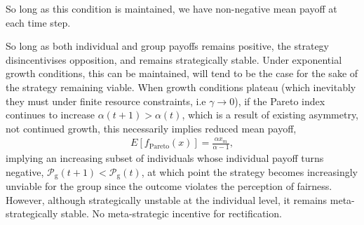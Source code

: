 \documentclass[twocolumn, aps, rmp, amsmath, amssymb, nofootinbib, superscriptaddress, longbibliography, floatfix, table-of-contents, eqsecnum]{revtex4-1}
\begin{document}
So long as this condition is maintained, we have non-negative mean payoff at each time step.

So long as both individual and group payoffs remains positive, the strategy disincentivises opposition, and remains strategically stable. Under exponential growth conditions, this can be maintained, will tend to be the case for the sake of the strategy remaining viable. When growth conditions plateau (which inevitably they must under finite resource constraints, i.e $\gamma\to 0$), if the Pareto index continues to increase $\alpha(t+1)>\alpha(t)$, which is a result of existing asymmetry, not continued growth, this necessarily implies reduced mean payoff,
\begin{align}
	E[f_\text{Pareto}(x)] = \frac{\alpha x_m}{\alpha - 1},
\end{align}
implying an increasing subset of individuals whose individual payoff turns negative, $\mathcal{P}_\text{g}(t+1)<\mathcal{P}_\text{g}(t)$, at which point the strategy becomes increasingly unviable for the group since the outcome violates the perception of fairness. However, although strategically unstable at the individual level, it remains meta-strategically stable. No meta-strategic incentive for rectification.


\end{document}
